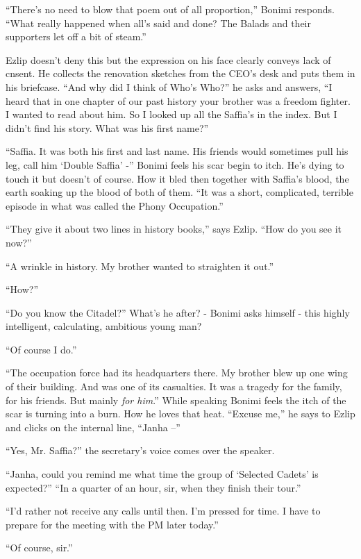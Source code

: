 \documentclass[twoside,11pt]{book}
\begin{document}
``There's no need to blow that poem out of all proportion,'' Bonimi responds.
``What really happened when all's said and done? The Balads and their supporters let off a bit of
steam.''

Ezlip doesn't deny this but the expression on his face clearly conveys lack of cnsent. He collects the renovation
sketches from the CEO's desk and puts them in his briefcase. ``And why did I think of Who's
Who?'' he asks and answers, ``I heard that in one chapter of our past history your brother
was a freedom fighter. I wanted to read about him. So I looked up all the Saffia's in the index. But I didn't find his
story. What was his first name?''

``Saffia. It was both his first and last name. His friends would sometimes pull his leg,
%
 call him `Double Saffia' -'' Bonimi feels his scar begin to itch. He's dying to touch it but doesn't of
course. How it bled then together with Saffia's blood, the earth soaking up the blood of both of them.
``It was a short, complicated, terrible episode in what was called the Phony Occupation.''

``They give it about two lines in history books,'' says Ezlip. ``How do you see
it now?''

``A wrinkle in history. My brother wanted to straighten it out.''

``How?''

``Do you know the Citadel?'' What's he after? - Bonimi asks himself - this highly intelligent,
calculating, ambitious young man?

``Of course I do.''

``The occupation force had its headquarters there. My brother blew up one wing of their building. And was
one of its casualties. It was a tragedy for the family, for his friends. But mainly \textit{for him}.''
 While speaking Bonimi feels the itch of the scar is turning into a burn. How he loves that heat.
``Excuse me,'' he says to Ezlip and clicks on the internal line,
``Janha --''

``Yes, Mr. Saffia?'' the secretary's voice comes over the speaker.

``Janha, could you remind me what time the group of `Selected Cadets' is
expected?'' ``In a quarter of an hour, sir, when they finish their tour.''

``I'd rather not receive any calls until then. I'm pressed for time. I have to prepare for the meeting with
the PM later today.''

``Of course, sir.''
\end{document}
